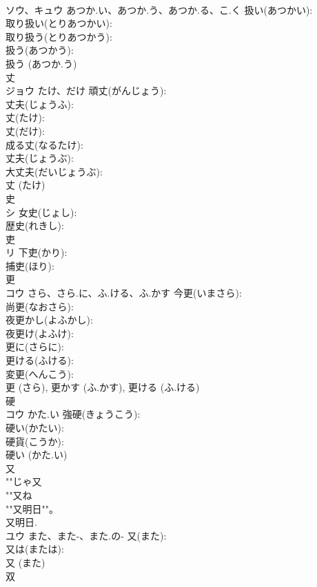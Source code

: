 \documentclass[8pt]{extreport}
\begin{document}
\begin{CJK}{UTF8}{min}
\\	ソウ、キュウ	あつか.い、あつか.う、あつか.る、こ.く	扱い(あつかい): 
\\	取り扱い(とりあつかい): 
\\	取り扱う(とりあつかう): 
\\	扱う(あつかう): 
\\	扱う (あつか.う)
\\	丈			
\\	ジョウ	たけ、だけ	頑丈(がんじょう): 
\\	丈夫(じょうふ): 
\\	丈(たけ): 
\\	丈(だけ): 
\\	成る丈(なるたけ): 
\\	丈夫(じょうぶ): 
\\	大丈夫(だいじょうぶ): 
\\	丈 (たけ)
\\	史			
\\	シ		女史(じょし): 
\\	歴史(れきし): 
\\	吏			
\\	リ		下吏(かり): 
\\	捕吏(ほり): 
\\	更			
\\	コウ	さら、さら.に、ふ.ける、ふ.かす	今更(いまさら): 
\\	尚更(なおさら): 
\\	夜更かし(よふかし): 
\\	夜更け(よふけ): 
\\	更に(さらに): 
\\	更ける(ふける): 
\\	変更(へんこう): 
\\	更 (さら), 更かす (ふ.かす), 更ける (ふ.ける)
\\	硬			
\\	コウ	かた.い	強硬(きょうこう): 
\\	硬い(かたい): 
\\	硬貨(こうか): 
\\	硬い (かた.い)
\\	又			
\\	""じゃ又
\\	""又ね
\\	""又明日""。 
\\	又明日.
\\	ユウ	また、また-、また.の-	又(また): 
\\	又は(または): 
\\	又 (また)
\\	双			

\end{CJK}
\end{document}
